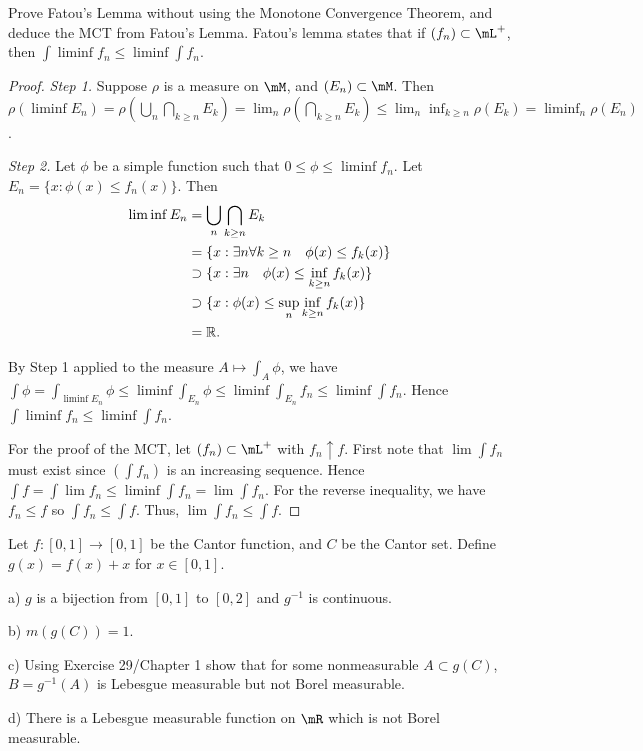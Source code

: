 \documentclass{article}
\begin{document}
 Prove Fatou's Lemma without using the Monotone Convergence Theorem, and deduce the MCT from Fatou's Lemma. Fatou's lemma states that if $(f_n) \subset \mL^+$, then $\int \liminf f_n \le \liminf \int f_n$.
\begin{proof}
\emph{Step 1.} Suppose $\rho$ is a measure on $\mM$, and $(E_n) \subset \mM$. Then $\rho(\liminf E_n) = \rho(\bigcup_n \bigcap_{k \ge n} E_k)  = \lim_n \rho(\bigcap_{k \ge n} E_k)  \le  \lim_n \inf_{k \ge n} \rho(E_k) = \liminf_n \rho(E_n)$.

\emph{Step 2.} Let $\phi$ be a simple function such that $0 \le \phi \le \liminf f_n$.  Let $E_n = \{x : \phi(x) \le f_n(x) \}$.  Then 
\begin{align*}
\liminf E_n & = \bigcup_n \bigcap_{k \ge n} E_k
\\ &  = \{x : \exists n \forall k \ge n \quad \phi(x) \le f_k(x) \} 
\\ &  \supset \{x : \exists n \quad \phi(x) \le \inf_{k \ge n} f_k(x) \} 
\\ & \supset \{x : \phi(x) \le \sup_n \inf_{k \ge n} f_k(x)\} 
\\ & = \mathbb{R}.
\end{align*}

 By Step 1 applied to the measure $A \mapsto \int_A \phi$, we have $\int \phi = \int_{\liminf E_n} \phi \le \liminf \int_{E_n} \phi \le \liminf \int_{E_n} f_n \le \liminf \int f_n$. Hence $\int \liminf f_n \le \liminf \int f_n$.

For the proof of the MCT, let $(f_n) \subset \mL^+$ with $f_n \uparrow f$. First note that $\lim \int f_n$ must exist since $(\int f_n)$ is an increasing sequence.  Hence $\int f = \int \lim f_n \le \liminf \int f_n = \lim \int f_n$. For the reverse inequality, we have $f_n \le f$ so $\int f_n \le \int f$. Thus, $\lim \int f_n \le \int f$.
\end{proof}

 Let $f : [0,1] \to [0,1]$ be the Cantor function, and $C$ be the Cantor set.  Define $g(x) = f(x) + x$ for $x \in [0,1]$.

a) $g$ is a bijection from $[0,1]$ to $[0,2]$ and $g^{-1}$ is continuous.

b) $m(g(C)) = 1$.

c) Using Exercise 29/Chapter 1 show that for some nonmeasurable $A \subset g(C)$, $B = g^{-1}(A)$ is Lebesgue measurable but not Borel measurable.

d) There is a Lebesgue measurable function on $\mR$ which is not Borel measurable.
\end{document}
